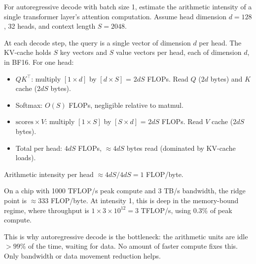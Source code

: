 \begin{thinkfirst}
For autoregressive decode with batch size 1, estimate the arithmetic intensity of a single transformer layer's attention computation. Assume head dimension $d = 128$, 32 heads, and context length $S = 2048$.

At each decode step, the query is a single vector of dimension $d$ per head. The KV-cache holds $S$ key vectors and $S$ value vectors per head, each of dimension $d$, in BF16. For one head:
\begin{itemize}
  \item $QK^\top$: multiply $[1 \times d]$ by $[d \times S]$ = $2dS$ FLOPs. Read $Q$ ($2d$ bytes) and $K$ cache ($2dS$ bytes).
  \item Softmax: $O(S)$ FLOPs, negligible relative to matmul.
  \item $\text{scores} \times V$: multiply $[1 \times S]$ by $[S \times d]$ = $2dS$ FLOPs. Read $V$ cache ($2dS$ bytes).
  \item Total per head: $4dS$ FLOPs, $\approx 4dS$ bytes read (dominated by KV-cache loads).
\end{itemize}

Arithmetic intensity per head $\approx 4dS / 4dS = 1$ FLOP/byte.

On a chip with 1000 TFLOP/s peak compute and 3 TB/s bandwidth, the ridge point is $\approx 333$ FLOP/byte. At intensity 1, this is deep in the memory-bound regime, where throughput is $1 \times 3 \times 10^{12} = 3$ TFLOP/s, using 0.3\% of peak compute.

This is why autoregressive decode is the bottleneck: the arithmetic units are idle $>99\%$ of the time, waiting for data. No amount of faster compute fixes this. Only bandwidth or data movement reduction helps.
\end{thinkfirst}


